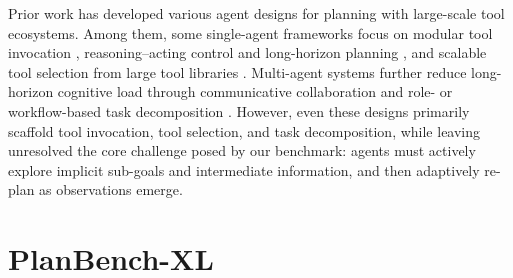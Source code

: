 \documentclass{llmxive}
\providecommand{\bench}[1]{PlanBench-XL}
\begin{document}

Prior work has developed various agent designs for planning with large-scale tool ecosystems. 
Among them, some single-agent frameworks focus on modular tool invocation \citep{karpas2022mrkl, schick2023toolformer}, reasoning--acting control and long-horizon planning \citep{erdogan2025planact, ReAct, koh2025treesearch}, and scalable tool selection from large tool libraries \citep{AnyTool, ToolGen, AutoTool}. 
Multi-agent systems further reduce long-horizon cognitive load through communicative collaboration \citep{li2023camel, wu2024autogen, chen2024agentverse} and role- or workflow-based task decomposition \citep{hong2024metagpt, chen2025smurfs, ling2025elhplan}. 
However, even these designs primarily scaffold tool invocation, tool selection, and task decomposition, while leaving unresolved the core challenge posed by our benchmark: agents must actively explore implicit sub-goals and intermediate information, and then adaptively re-plan as observations emerge.




\section{\bench{}}
\label{sec:benchmark}
\end{document}
